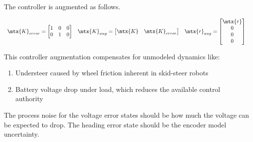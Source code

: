 The controller is augmented as follows.

\begin{equation}
  \begin{array}{ccc}
    \mtx{K}_{error} =
    \begin{bmatrix}
      1 & 0 & 0 \\
      0 & 1 & 0
    \end{bmatrix} &
    \mtx{K}_{aug} = \begin{bmatrix}
      \mtx{K} & \mtx{K}_{error}
    \end{bmatrix} &
    \mtx{r}_{aug} = \begin{bmatrix}
      \mtx{r} \\
      0 \\
      0 \\
      0
    \end{bmatrix}
  \end{array}
\end{equation}

This controller augmentation compensates for unmodeled dynamics like:

\begin{enumerate}
  \item Understeer caused by wheel friction inherent in skid-steer robots
  \item Battery voltage drop under load, which reduces the available control
    authority
\end{enumerate}

\begin{remark}
  The process noise for the voltage error states should be how much the voltage
  can be expected to drop. The heading error state should be the encoder
  \gls{model} uncertainty.
\end{remark}

